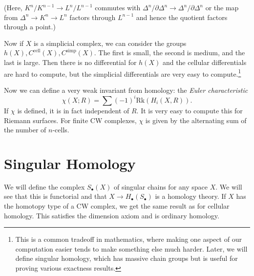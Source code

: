 \documentclass[leqno, openany]{memoir}
\theoremstyle{definition}
\theoremstyle{remark}
\theoremstyle{plain}
\theoremstyle{definition}
\theoremstyle{remark}
\newcommand{\mr}[1]{\mathrm{#1}}
\begin{document}
(Here, $K^n / K^{n-1} \to L^n / L^{n-1}$ commutes with $\Delta^n / \partial \Delta^n \to \Delta^n / \partial \Delta^n$ or the map from $\Delta^n \to K^n \to L^n$ factors through $L^{n-1}$ and hence the quotient factors through a point.) 

Now if $X$ is a simplicial complex, we can consider the groups $h(X), C^{\mr{cell}}(X), C^{\mr{simp}}(X)$. The first is small, the second is medium, and the last is large. Then there is no differential for $h(X)$ and the cellular differentials are hard to compute, but the simplicial differentials are very easy to compute.\footnote{This is a common tradeoff in mathematics, where making one aspect of our computation easier tends to make something else much harder. Later, we will define singular homology, which has massive chain groups but is useful for proving various exactness results.}

Now we can define a very weak invariant from homology: the \textit{Euler characteristic}
\[ \chi(X; R) = \sum (-1)^i \mr{Rk}(H_i(X, R)). \]
If $\chi$ is defined, it is in fact independent of $R$. It is very easy to compute this for Riemann surfaces. For finite CW complexes, $\chi$ is given by the alternating sum of the number of $n$-cells.

\section{Singular Homology}%
\label{sec:singular_homology}

We will define the complex $S_{\bullet}(X)$ of singular chains for any space $X$. We will see that this is functorial and that $X \to H_{\bullet}(S_{\bullet})$ is a homology theory. If $X$ has the homotopy type of a CW complex, we get the same result as for cellular homology. This satisfies the dimension axiom and is ordinary homology.
\end{document}
